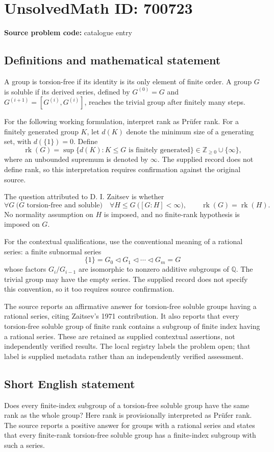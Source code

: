 \documentclass[11pt]{article}
\newcommand{\Z}{\mathbb{Z}}
\newcommand{\Q}{\mathbb{Q}}
\begin{document}
\section*{UnsolvedMath ID: 700723}
\textbf{Source problem code:} catalogue entry
\subsection{Definitions and mathematical statement}
A group is torsion-free if its identity is its only element of finite order. A group \(G\) is soluble if its derived series, defined by \(G^{(0)}=G\) and \(G^{(i+1)}=[G^{(i)},G^{(i)}]\), reaches the trivial group after finitely many steps.

For the following working formulation, interpret rank as Prüfer rank. For a finitely generated group \(K\), let \(d(K)\) denote the minimum size of a generating set, with \(d(\{1\})=0\). Define
\[
\operatorname{rk}(G)=\sup\{d(K):K\leq G\text{ is finitely generated}\}\in\Z_{\geq0}\cup\{\infty\},
\]
where an unbounded supremum is denoted by \(\infty\). The supplied record does not define rank, so this interpretation requires confirmation against the original source.

The question attributed to D. I. Zaitsev is whether
\[
\forall G\ \bigl(G\text{ torsion-free and soluble}\bigr)\quad
\forall H\leq G\ \bigl([G:H]<\infty\bigr),\qquad
\operatorname{rk}(G)=\operatorname{rk}(H).
\]
No normality assumption on \(H\) is imposed, and no finite-rank hypothesis is imposed on \(G\).

For the contextual qualifications, use the conventional meaning of a rational series: a finite subnormal series
\[
\{1\}=G_0\triangleleft G_1\triangleleft\cdots\triangleleft G_m=G
\]
whose factors \(G_i/G_{i-1}\) are isomorphic to nonzero additive subgroups of \(\Q\). The trivial group may have the empty series. The supplied record does not specify this convention, so it too requires source confirmation.

The source reports an affirmative answer for torsion-free soluble groups having a rational series, citing Zaitsev's 1971 contribution. It also reports that every torsion-free soluble group of finite rank contains a subgroup of finite index having a rational series. These are retained as supplied contextual assertions, not independently verified results. The local registry labels the problem open; that label is supplied metadata rather than an independently verified assessment.
\subsection{Short English statement}
Does every finite-index subgroup of a torsion-free soluble group have the same rank as the whole group? Here rank is provisionally interpreted as Prüfer rank. The source reports a positive answer for groups with a rational series and states that every finite-rank torsion-free soluble group has a finite-index subgroup with such a series.
\end{document}
